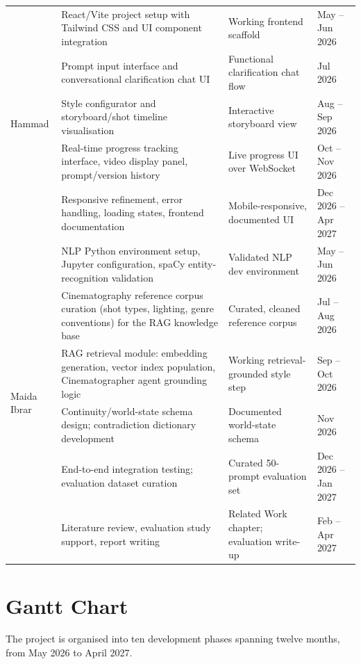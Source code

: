 \documentclass[11pt,a4paper]{article}
\begin{document}
\begin{center}
\begin{longtable}{|p{2.2cm}|p{5.9cm}|p{3.4cm}|p{2.1cm}|}
\multirow{5}{2.2cm}{Hammad}
 & React/Vite project setup with Tailwind CSS and UI component integration & Working frontend scaffold & May -- Jun 2026 \\
 & Prompt input interface and conversational clarification chat UI & Functional clarification chat flow & Jul 2026 \\
 & Style configurator and storyboard/shot timeline visualisation & Interactive storyboard view & Aug -- Sep 2026 \\
 & Real-time progress tracking interface, video display panel, prompt/version history & Live progress UI over WebSocket & Oct -- Nov 2026 \\
 & Responsive refinement, error handling, loading states, frontend documentation & Mobile-responsive, documented UI & Dec 2026 -- Apr 2027 \\
\hline

\multirow{6}{2.2cm}{Maida Ibrar}
 & NLP Python environment setup, Jupyter configuration, spaCy entity-recognition validation & Validated NLP dev environment & May -- Jun 2026 \\
 & Cinematography reference corpus curation (shot types, lighting, genre conventions) for the RAG knowledge base & Curated, cleaned reference corpus & Jul -- Aug 2026 \\
 & RAG retrieval module: embedding generation, vector index population, Cinematographer agent grounding logic & Working retrieval-grounded style step & Sep -- Oct 2026 \\
 & Continuity/world-state schema design; contradiction dictionary development & Documented world-state schema & Nov 2026 \\
 & End-to-end integration testing; evaluation dataset curation & Curated 50-prompt evaluation set & Dec 2026 -- Jan 2027 \\
 & Literature review, evaluation study support, report writing & Related Work chapter; evaluation write-up & Feb -- Apr 2027 \\
\hline
\end{longtable}
\end{center}

\needspace{0.5\textheight}
\section{Gantt Chart}

The project is organised into ten development phases spanning twelve months, from May 2026 to April 2027.
\end{document}

